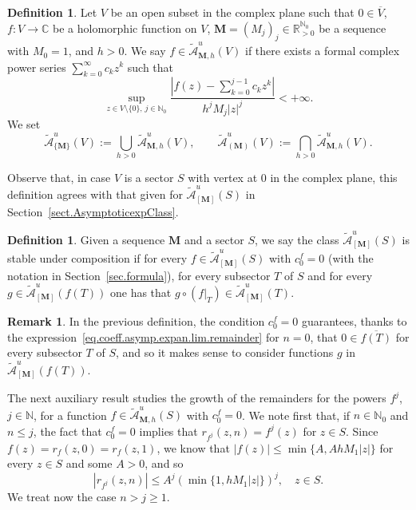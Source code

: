 \documentclass[11pt,a4paper]{article}
\theoremstyle{plain}
\theoremstyle{definition}
\newtheorem{definition}[proposition]{Definition}
\newtheorem{remark}[proposition]{Remark}
\newcommand{\RR}{\mathbb{R}}
\newcommand{\CC}{\mathbb{C}}
\newcommand{\NN}{\mathbb{N}}
\newcommand{\M}{\mathbf{M}}
\begin{document}
\begin{definition}\label{def.UniformAsympComplexPlane}
Let $V$ be an open subset in the complex plane such that $0\in\overline{V}$, $f\colon V\to\CC$ be a holomorphic function on $V$, $\M=(M_j)_j\in\RR_{>0}^{\NN_0}$ be a sequence with $M_0=1$, and $h>0$. We say $f\in\widetilde{\mathcal{A}}_{\M,h}^{u}(V)$ if there exists a formal complex power series $\sum_{k=0}^{\infty}c_kz^k$  such that
\[
\sup_{z\in V\setminus\{0\},\,j\in\NN_{0}}\frac{|f(z)-\sum_{k=0}^{j-1}c_kz^k|}{h^{j}M_{j}|z|^j}<+\infty.
\]   
We set 
$$\widetilde{\mathcal{A}}_{\{\M\}}^{u}(V):=\bigcup_{h>0}\widetilde{\mathcal{A}}_{\M,h}^{u}(V),\qquad
\widetilde{\mathcal{A}}_{(\M)}^{u}(V):=\bigcap_{h>0}\widetilde{\mathcal{A}}_{\M,h}^{u}(V).$$
\end{definition}

Observe that, in case $V$ is a sector $S$ with vertex at 0 in the complex plane, this definition agrees with that given for $\widetilde{\mathcal{A}}_{[\M]}^{u}(S)$
in Section~\ref{sect.AsymptoticexpClass}. 

\begin{definition}\label{def.StabilityCompos}
Given a sequence $\M$ and a sector $S$, we say the class $\widetilde{\mathcal{A}}_{[\M]}^{u}(S)$ is stable under composition if for every $f\in\widetilde{\mathcal{A}}_{[\M]}^{u}(S)$ with $c^f_0=0$ (with the notation in Section~\ref{sec.formula}), for every subsector $T$ of $S$ and for every $g\in\widetilde{\mathcal{A}}_{[\M]}^{u}(f(T))$ one has that $g\circ (f|_T)\in\widetilde{\mathcal{A}}_{[\M]}^{u}(T)$.
\end{definition}

\begin{remark}
In the previous definition, the condition $c_0^f=0$ guarantees, thanks to the expression~\eqref{eq.coeff.asymp.expan.lim.remainder} for $n=0$, that $0\in\overline{f(T)}$ for every subsector $T$ of $S$, and so it makes sense to consider functions $g$ in $\widetilde{\mathcal{A}}_{[\M]}^{u}(f(T))$. 
\end{remark}

The next auxiliary result studies the growth of the remainders for the powers $f^j$, $j\in\NN$, for a function $f\in\widetilde{\mathcal{A}}_{\M,h}^{u}(S)$ with $c_0^f=0$. We note first that, if $n\in\NN_0$ and $n\le j$, the fact that $c_0^f=0$ implies that $r_{f^j}(z,n)=f^j(z)$ for $z\in S$. Since $f(z)=r_f(z,0)=r_f(z,1)$, we know that $|f(z)|\le \min\{A,AhM_1|z|\}$ for every $z\in S$ and some $A>0$, and so
\begin{equation}\label{eq.bound.remainders.fpowerj.n_at_most_j}
    |r_{f^j}(z,n)|\le A^j(\min\{1,hM_1|z|\})^j,\quad z\in S.
\end{equation}
We treat now the case $n>j\ge 1$.
\end{document}
